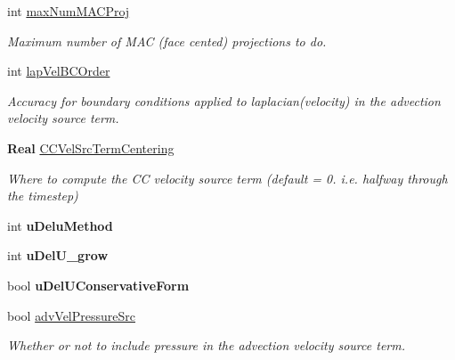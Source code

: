 \begin{DoxyCompactItemize}
int \hyperlink{struct_mushy_layer_options_a629685501c6aa2109348a6166b9953ac}{max\+Num\+M\+A\+C\+Proj}
\begin{DoxyCompactList}\small\item\em Maximum number of M\+AC (face cented) projections to do. \end{DoxyCompactList}\item 
\mbox{\label{struct_mushy_layer_options_aa7af7e2f26de24f23e02c52d035f9b70}} 
int \hyperlink{struct_mushy_layer_options_aa7af7e2f26de24f23e02c52d035f9b70}{lap\+Vel\+B\+C\+Order}
\begin{DoxyCompactList}\small\item\em Accuracy for boundary conditions applied to laplacian(velocity) in the advection velocity source term. \end{DoxyCompactList}\item 
\mbox{\label{struct_mushy_layer_options_a238e5c01205e1ca02ab490263321863c}} 
\textbf{ Real} \hyperlink{struct_mushy_layer_options_a238e5c01205e1ca02ab490263321863c}{C\+C\+Vel\+Src\+Term\+Centering}
\begin{DoxyCompactList}\small\item\em Where to compute the CC velocity source term (default = 0. i.\+e. halfway through the timestep) \end{DoxyCompactList}\item 
\mbox{\label{struct_mushy_layer_options_a87fc3eca6907a5fd12f3bbf0a73c8552}} 
int {\bfseries u\+Delu\+Method}
\item 
\mbox{\label{struct_mushy_layer_options_acdb5e62a932e22f25225cc87f8081cb1}} 
int {\bfseries u\+Del\+U\+\_\+grow}
\item 
\mbox{\label{struct_mushy_layer_options_aa098e8b972f1e55db87e79b968a332ce}} 
bool {\bfseries u\+Del\+U\+Conservative\+Form}
\item 
\mbox{\label{struct_mushy_layer_options_a1b1084eb70af14101d72d8a20e067716}} 
bool \hyperlink{struct_mushy_layer_options_a1b1084eb70af14101d72d8a20e067716}{adv\+Vel\+Pressure\+Src}
\begin{DoxyCompactList}\small\item\em Whether or not to include pressure in the advection velocity source term. \end{DoxyCompactList}\item 

\end{DoxyCompactItemize}
